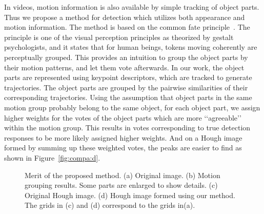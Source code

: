\documentclass{mva2011}
\begin{document}
In videos, motion information is also available by simple tracking of object parts. Thus we propose a method for detection which utilizes both appearance and motion information. The method is based on the common fate principle~\cite{ac13}. The principle is one of the visual perception principles as theorized by gestalt psychologists, and it states that for human beings, tokens moving coherently are perceptually grouped. This provides an intuition to group the object parts by their motion patterns, and let them vote afterwards. In our work, the object parts are represented using keypoint descriptors, which are tracked to generate trajectories. The object parts are grouped by the pairwise similarities of their corresponding trajectories. Using the assumption that object parts in the same motion group  probably belong to the same object, for each object part, we assign higher weights for the votes of the object parts which are more {\lq\lq}agreeable{\rq\rq} within the motion group. This results in votes corresponding to true detection responses to be more likely assigned higher weights. And on a Hough image formed by summing up these weighted votes, the peaks are easier to find as shown in Figure~\ref{fig:compa:d}.




\begin{figure}
\centering
{}
\caption{Merit of the proposed method. (a) Original image. (b) Motion   grouping results.  Some parts are enlarged to show details. (c) Original Hough image. (d) Hough image formed using our method. The grids in (c) and (d) correspond to the grids in(a).}
\label{fig:compa}
\end{figure}
\end{document}
